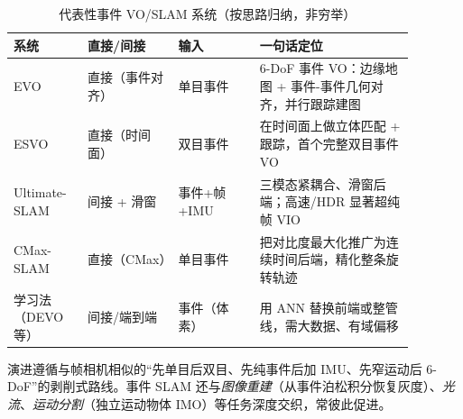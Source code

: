 \begin{table}[H]\centering\small
\caption{代表性事件 VO/SLAM 系统（按思路归纳，非穷举）}
\label{tab:event-systems}
\begin{tabular}{p{0.16\linewidth}p{0.20\linewidth}p{0.18\linewidth}p{0.34\linewidth}}
\toprule
系统 & 直接/间接 & 输入 & 一句话定位 \\
\midrule
EVO\cite{rebecq2017evo} & 直接（事件对齐）& 单目事件 & 6-DoF 事件 VO：边缘地图 + 事件-事件几何对齐，并行跟踪建图 \\
ESVO\cite{zhou2021esvo} & 直接（时间面）& 双目事件 & 在时间面上做立体匹配 + 跟踪，首个完整双目事件 VO \\
Ultimate-SLAM\cite{vidal2018ultimate} & 间接 + 滑窗 & 事件+帧+IMU & 三模态紧耦合、滑窗后端；高速/HDR 显著超纯帧 VIO \\
CMax-SLAM\cite{guo2024cmaxslam} & 直接（CMax）& 单目事件 & 把对比度最大化推广为连续时间后端，精化整条旋转轨迹 \\
学习法（DEVO 等）\cite{gallego2022eventsurvey} & 间接/端到端 & 事件（体素）& 用 ANN 替换前端或整管线，需大数据、有域偏移 \\
\bottomrule
\end{tabular}
\end{table}

\noindent 演进遵循与帧相机相似的“先单目后双目、先纯事件后加 IMU、先窄运动后 6-DoF”的剥削式路线\cite{gallego2022eventsurvey}。事件 SLAM 还与\emph{图像重建}（从事件泊松积分恢复灰度）、\emph{光流}、\emph{运动分割}（独立运动物体 IMO）等任务深度交织，常彼此促进。

